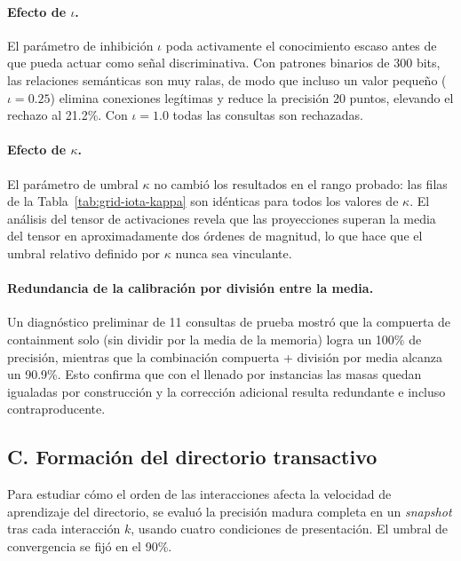 \paragraph{Efecto de $\iota$.}
El parámetro de inhibición $\iota$ poda activamente el conocimiento escaso antes de que pueda actuar como señal discriminativa.
Con patrones binarios de 300 bits, las relaciones semánticas son muy ralas, de modo que incluso un valor pequeño ($\iota = 0.25$) elimina conexiones legítimas y reduce la precisión 20 puntos, elevando el rechazo al 21.2\%.
Con $\iota = 1.0$ todas las consultas son rechazadas.

\paragraph{Efecto de $\kappa$.}
El parámetro de umbral $\kappa$ no cambió los resultados en el rango probado: las filas de la Tabla~\ref{tab:grid-iota-kappa} son idénticas para todos los valores de $\kappa$.
El análisis del tensor de activaciones revela que las proyecciones superan la media del tensor en aproximadamente dos órdenes de magnitud, lo que hace que el umbral relativo definido por $\kappa$ nunca sea vinculante.

\paragraph{Redundancia de la calibración por división entre la media.}
Un diagnóstico preliminar de 11 consultas de prueba mostró que la compuerta de containment solo (sin dividir por la media de la memoria) logra un 100\% de precisión, mientras que la combinación compuerta + división por media alcanza un 90.9\%.
Esto confirma que con el llenado por instancias las masas quedan igualadas por construcción y la corrección adicional resulta redundante e incluso contraproducente.

\subsection{C. Formación del directorio transactivo}
\label{sec:formacion}

Para estudiar cómo el orden de las interacciones afecta la velocidad de aprendizaje del directorio, se evaluó la precisión madura completa en un \textit{snapshot} tras cada interacción $k$, usando cuatro condiciones de presentación.
El umbral de convergencia se fijó en el 90\%.

